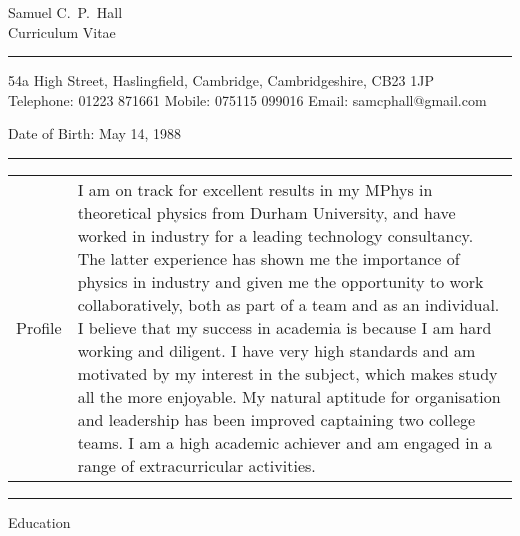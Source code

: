 \begin{center}
	\sc\LARGE Samuel C.~P.~Hall\\
	\large Curriculum Vitae
	\vspace{0.4cm}\hrule
\end{center}

\begin{center}
	\sc 54a High Street, Haslingfield, Cambridge, Cambridgeshire, CB23 1JP\\
	\sc Telephone: 01223 871661\;\;  Mobile: 075115 099016\;\;  Email: \rm samcphall@gmail.com

	\sc Date of Birth: May 14, 1988
\end{center}


\vspace{0.2cm}\hrule\vspace{0.2cm}

\begin{tablehere}
  \begin{tabular}{p{\wa\textwidth} p{\wb\textwidth}}
    \sc Profile	&
    I am on track for excellent results in my MPhys in theoretical physics from
    Durham University, and have worked in industry for a leading technology
    consultancy.  The latter experience has shown me the importance of physics in
    industry and given me the opportunity to work collaboratively, both as part of
    a team and as an individual.  I believe that my success in academia is because
    I am hard working and diligent.  I have very high standards and am motivated
    by my interest in the subject, which makes study all the more enjoyable.  My
    natural aptitude for organisation and leadership has been improved captaining
    two college teams.  I am a high academic achiever and am engaged in a range of
    extracurricular activities.
  \end{tabular}
\end{tablehere}


\vspace{0.2cm}\hrule\vspace{0.2cm}
\sc Education \rm

